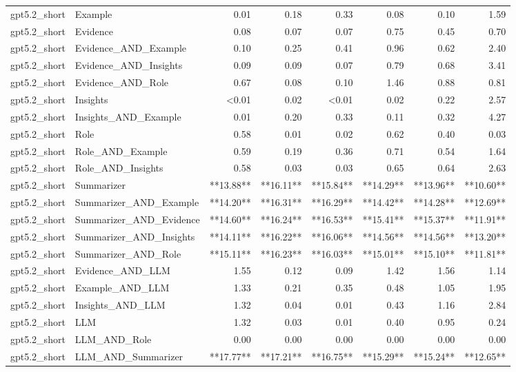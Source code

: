 \begin{tabular}{llrrrrrr}
gpt5.2_short & Example & 0.01 & 0.18 & 0.33 & 0.08 & 0.10 & 1.59 \\
gpt5.2_short & Evidence & 0.08 & 0.07 & 0.07 & 0.75 & 0.45 & 0.70 \\
gpt5.2_short & Evidence_AND_Example & 0.10 & 0.25 & 0.41 & 0.96 & 0.62 & 2.40 \\
gpt5.2_short & Evidence_AND_Insights & 0.09 & 0.09 & 0.07 & 0.79 & 0.68 & 3.41 \\
gpt5.2_short & Evidence_AND_Role & 0.67 & 0.08 & 0.10 & 1.46 & 0.88 & 0.81 \\
gpt5.2_short & Insights & <0.01 & 0.02 & <0.01 & 0.02 & 0.22 & 2.57 \\
gpt5.2_short & Insights_AND_Example & 0.01 & 0.20 & 0.33 & 0.11 & 0.32 & 4.27 \\
gpt5.2_short & Role & 0.58 & 0.01 & 0.02 & 0.62 & 0.40 & 0.03 \\
gpt5.2_short & Role_AND_Example & 0.59 & 0.19 & 0.36 & 0.71 & 0.54 & 1.64 \\
gpt5.2_short & Role_AND_Insights & 0.58 & 0.03 & 0.03 & 0.65 & 0.64 & 2.63 \\
gpt5.2_short & Summarizer & **13.88** & **16.11** & **15.84** & **14.29** & **13.96** & **10.60** \\
gpt5.2_short & Summarizer_AND_Example & **14.20** & **16.31** & **16.29** & **14.42** & **14.28** & **12.69** \\
gpt5.2_short & Summarizer_AND_Evidence & **14.60** & **16.24** & **16.53** & **15.41** & **15.37** & **11.91** \\
gpt5.2_short & Summarizer_AND_Insights & **14.11** & **16.22** & **16.06** & **14.56** & **14.56** & **13.20** \\
gpt5.2_short & Summarizer_AND_Role & **15.11** & **16.23** & **16.03** & **15.01** & **15.10** & **11.81** \\
gpt5.2_short & Evidence_AND_LLM & 1.55 & 0.12 & 0.09 & 1.42 & 1.56 & 1.14 \\
gpt5.2_short & Example_AND_LLM & 1.33 & 0.21 & 0.35 & 0.48 & 1.05 & 1.95 \\
gpt5.2_short & Insights_AND_LLM & 1.32 & 0.04 & 0.01 & 0.43 & 1.16 & 2.84 \\
gpt5.2_short & LLM & 1.32 & 0.03 & 0.01 & 0.40 & 0.95 & 0.24 \\
gpt5.2_short & LLM_AND_Role & 0.00 & 0.00 & 0.00 & 0.00 & 0.00 & 0.00 \\
gpt5.2_short & LLM_AND_Summarizer & **17.77** & **17.21** & **16.75** & **15.29** & **15.24** & **12.65** \\

\end{tabular}

